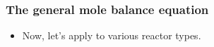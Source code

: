 \begin{frame}\frametitle{The general mole balance equation} 
	\begin{itemize}
		\item	Now, let's apply to various reactor types. 
	\end{itemize}
\end{frame}

\begin{comment}

\section{Batch}
\begin{frame}\frametitle{1.3 Batch reactors} 
	\begin{itemize}
		\item	No inflow or outflow. 
		\item	Charge reactors with reactants then close up.
		
		\item	Typically perfectly mixed, so $\int_V r_j(V)dV$ can be replaced by $r_jV$ 
	\end{itemize}
\end{frame}

\begin{frame}
	\begin{itemize}
		\item	<1->{ The mole balance reduces to $$\frac{dN_j}{dt} = r_jV$$ } 
		\item	<1->{\textbf{Note:} $V$ is \emph{not} assumed to be constant here. It could be a function of time or of the extent of reaction (and indirectly a function of time).} 
	\end{itemize}
\end{frame}

\begin{frame}\frametitle{Problem 1.1} 
	\begin{itemize}
		\item	<1->{$$A\longrightarrow2B, -r_A = kC_A, k = 0.23\text{min}^{-1}$$ in a const volume batch reactor. $C_{A0} = 2$mol/L, $V=10$L. How long does it take to reduce the conc of $A$ in reactor to 0.2 mol/L? } 
		\item	<1->{\textcolor{blue}{Solution: {\bf First solve analytically}} $$\frac{dN_A}{dt} = r_AV = -kC_AV$$ } 
	\end{itemize}
\end{frame}

\begin{frame}\frametitle{Solution 1.1}
	For const V,
	\begin{align*}
		&\frac{d(N_A/V)}{dt} = -kC_A\\
		&\frac{dC_A}{dt} = -kC_A\\
		&\Rightarrow \int_{C_{A0}}^{C_{Af}}\frac{dC_A}{C_A} = -k\int_0^{t_f}dt\\
		&\Rightarrow \ln\frac{C_{Af}}{C_{A0}} = -kt_f 
	\end{align*}
\end{frame}


\end{comment}

